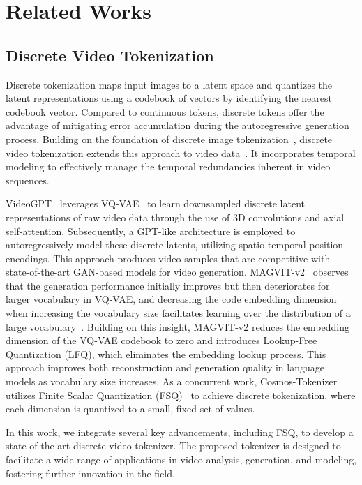 \documentclass{article} %
\begin{document}
\section{Related Works}
\label{sec:relatedwork}
\subsection{Discrete Video Tokenization}

Discrete tokenization maps input images to a latent space and quantizes the latent representations using a codebook of vectors by identifying the nearest codebook vector. Compared to continuous tokens, discrete tokens offer the advantage of mitigating error accumulation during the autoregressive generation process. Building on the foundation of discrete image tokenization~\citep{van2017neuralvqvae}, discrete video tokenization extends this approach to video data~\citep{yan2021videogpt,yu2024language,wang2024omnitokenizer,repocosmos}. It incorporates temporal modeling to effectively manage the temporal redundancies inherent in video sequences.

VideoGPT~\citep{yan2021videogpt} leverages VQ-VAE~\citep{van2017neuralvqvae} to learn downsampled discrete latent representations of raw video data through the use of 3D convolutions and axial self-attention. Subsequently, a GPT-like architecture is employed to autoregressively model these discrete latents, utilizing spatio-temporal position encodings. This approach produces video samples that are competitive with state-of-the-art GAN-based models for video generation.
MAGVIT-v2~\citep{yu2024language} observes that the generation performance initially improves but then deteriorates for larger vocabulary in VQ-VAE, and decreasing the code embedding dimension when increasing the vocabulary size facilitates learning over the distribution of a large vocabulary~\citep{yu2022vectorquantized}. Building on this insight, MAGVIT-v2 reduces the embedding dimension of the VQ-VAE codebook to zero and introduces Lookup-Free Quantization (LFQ), which eliminates the embedding lookup process. This approach improves both reconstruction and generation quality in language models as vocabulary size increases.
As a concurrent work, Cosmos-Tokenizer~\citep{repocosmos} utilizes Finite Scalar Quantization (FSQ)~\citep{mentzer2024finite} to achieve discrete tokenization, where each dimension is quantized to a small, fixed set of values.

In this work, we integrate several key advancements, including FSQ, to develop a state-of-the-art discrete video tokenizer. The proposed tokenizer is designed to facilitate a wide range of applications in video analysis, generation, and modeling, fostering further innovation in the field.
\end{document}
